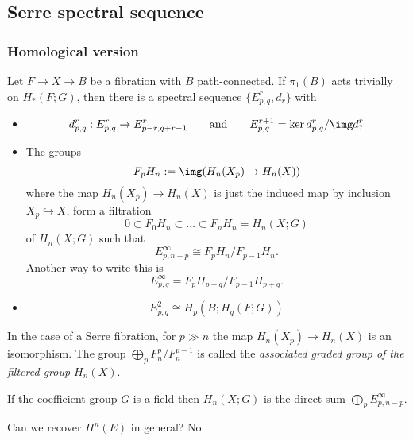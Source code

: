 \begin{definition}
\subsection{Serre spectral sequence}

\subsubsection{Homological version}

\begin{theorem}
	Let $F\to X\to B$ be a fibration with $B$ path-connected. If $\pi_1(B)$ acts trivially on $H_*(F;G)$, then there is a spectral sequence $\{E^r_{p,q},d_r\}$ with
	\begin{itemize}
		\item
			$$d^r_{p,q}:E^r_{p,q}\to E^r_{p-r,q+r-1}\qquad \text{and} \qquad E^{r+1}_{p,q}=\ker d^r_{p,q}/\img d^r_{{\color{magenta}?}}$$
		\item The groups
			$$F_pH_n:=\img(H_n(X_p)\to H_n(X))$$
		where the map $H_{n}(X_p)\to H_{n}(X)$ is just the induced map by inclusion $X_p\hookrightarrow X$, form a filtration
		$$0\subset F_0H_n\subset \ldots\subset F_nH_n=H_n(X;G)$$
		of $H_n(X;G)$ such that
		$$E^\infty_{p,n-p}\cong F_pH_n/F_{p-1}H_n.$$
		Another way to write this is
		$$E_{p,q}^\infty=F_pH_{p+q}\Big/F_{p-1}H_{p+q}.$$
	\item $$E^2_{p,q}\cong H_p(B;H_q(F;G))$$
\end{itemize}
\end{theorem}

\begin{remark}
	In the case of a Serre fibration, for $p\gg n$ the map $H_{n}(X_p)\to H_{n}(X)$ is an isomorphism. The group $\bigoplus_{p}F^p_n/F^{p-1}_n$ is called the {\it associated graded group of the filtered group $H_n(X)$}.
\end{remark}

\begin{remark}
	If the coefficient group $G$ is a field then $H_{n}(X;G)$ is the direct sum $\bigoplus_{p} E^\infty_{p,n-p}$.
\end{remark}

\begin{question}
	Can we recover $H^{n}(E)$ in general? No.
\end{question}


\end{definition}
